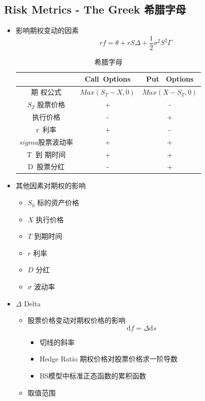 \documentclass[a4paper,6pt,twoside,openany]{article}
\begin{document}
\subsection{Risk Metrics - The Greek 希腊字母}
\begin{itemize}
\item 影响期权变动的因素
  $$rf = \theta + rS\Delta + \frac{1}{2} \sigma
  ^{2}S^{2}\Gamma$$
  \begin{table}[!htb]
    \renewcommand\arraystretch{1.5}
    \caption{希腊字母}
    \centering
    \begin{tabular}{|c|c|c|} \hline \rowcolor[gray]{0.5} & Call\ Options & Put \ Options \\ \hline 期
      权公式 & $Max(S_T - X , 0)$ & $Max(X - S_T,0 )$ \\ \hline $S_T$ 股票价格 & + & - \\ \hline \X
      执行价格 & - & + \\ \hline r\ 利率 & + & - \\ \hline $sigma$股票波动率 & + & + \\ \hline T\ 到
      期时间 & + & + \\ \hline D\ 股票分红 & - & + \\ \hline
    \end{tabular}
  \end{table}
\item 其他因素对期权的影响
  \begin{itemize}
  \item $S_{0}$ 标的资产价格
  \item $X$ 执行价格
  \item $T$ 到期时间
  \item $r$ 利率
  \item $D$ 分红
  \item $\sigma$ 波动率
  \end{itemize}
\item $\Delta$ Delta
  \begin{itemize}
  \item 股票价格变动对期权价格的影响 $$\mathrm{d}f = \Delta \mathrm{d}s$$
    \begin{itemize}
    \item 切线的斜率
    \item Hedge Ratio 期权价格对股票价格求一阶导数
    \item BS模型中标准正态函数的累积函数
    \end{itemize}
  \item 取值范围
    \begin{itemize}

\end{itemize}
\end{itemize}
\end{itemize}
\end{document}
